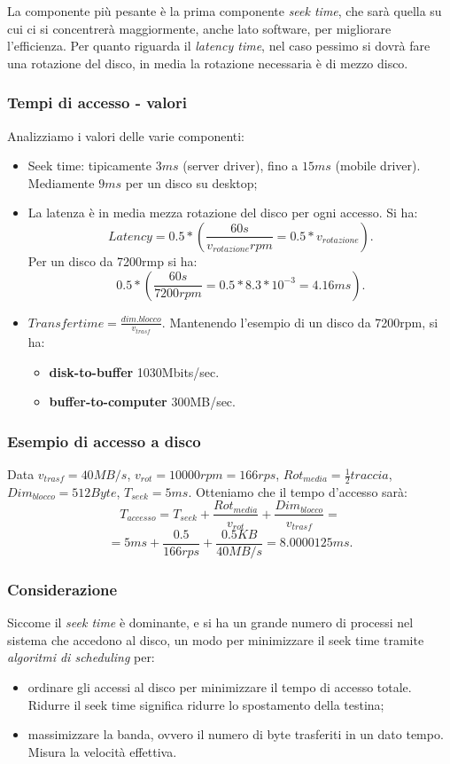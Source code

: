 \documentclass[a4paper,12pt, twoside]{report}
\begin{document}
La componente pi\`u pesante \`e la prima componente \emph{seek time}, che sar\`a quella su cui ci si 
concentrer\`a maggiormente, anche lato software, per migliorare l'efficienza. 
Per quanto riguarda il \emph{latency time}, nel caso pessimo si dovr\`a fare una rotazione del disco, in 
media la rotazione necessaria \`e di mezzo disco. 

\subsubsection{Tempi di accesso - valori}
Analizziamo i valori delle varie componenti:
\begin{itemize}
    \item Seek time: tipicamente $3ms$ (server driver), fino a $15ms$ (mobile driver). Mediamente $9ms$ per
    un disco su desktop;
    \item La latenza \`e in media mezza rotazione del disco per ogni accesso. Si ha:
    \[Latency = 0.5 * (\frac{60s}{v_{rotazione}rpm} = 0.5 * v_{rotazione}). \]
    Per un disco da 7200rmp si ha:
    \[ 0.5 * (\frac{60s}{7200rpm} = 0.5 * {8.3*10^{-3}} = 4.16ms). \]
    \item $Transfer time = \frac{dim. blocco}{v_{trasf}}$.
    Mantenendo l'esempio di un disco da 7200rpm, si ha:
    \begin{itemize}
        \item \textbf{disk-to-buffer} 1030Mbits/sec.
        \item \textbf{buffer-to-computer} 300MB/sec.
    \end{itemize}
\end{itemize}

\subsubsection{Esempio di accesso a disco}
Data $v_{trasf} = 40MB/s$, $v_{rot} = 10000rpm = 166rps$, $Rot_{media} = \frac{1}{2} traccia$,
$Dim_{blocco} = 512 Byte$, $T_{seek} = 5ms$.
Otteniamo che il tempo d'accesso sar\`a:
\[ T_{accesso} = T_{seek} + \frac{Rot_{media}}{v_{rot}} + \frac{Dim_{blocco}}{v_{trasf}} = \]
\[ = 5ms + \frac{0.5}{166rps} + \frac{0.5KB}{40MB/s} = 8.0000125ms.\]

\subsubsection{Considerazione}
Siccome il \emph{seek time} \`e dominante, e si ha un grande numero di processi nel sistema che 
accedono al disco, un modo per minimizzare il seek time tramite \emph{algoritmi di scheduling} per:
\begin{itemize}
    \item ordinare gli accessi al disco per minimizzare il tempo di accesso totale.  Ridurre il seek time
significa ridurre lo spostamento della testina;
    \item massimizzare la banda, ovvero il numero di byte trasferiti in un dato tempo. Misura la velocit\`a effettiva. 
\end{itemize}
\end{document}
